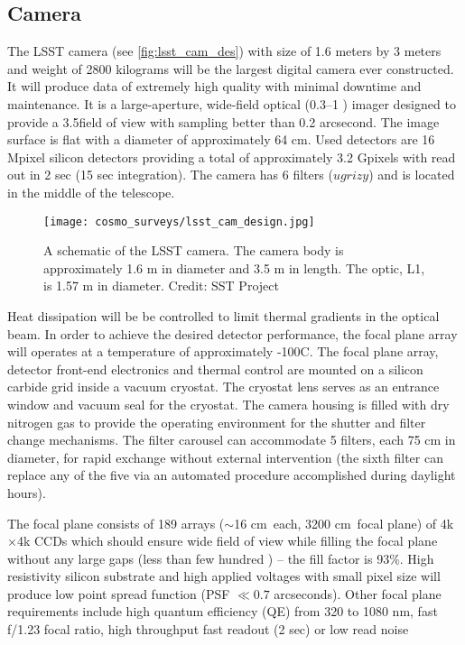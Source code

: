 \subsection{Camera}
The LSST camera (see \autoref{fig:lsst_cam_des}) with size of 1.6 meters by 3 meters and weight of 2800 kilograms will be the largest digital camera ever constructed. It will produce data of extremely high quality with minimal downtime and maintenance. It is a large-aperture, wide-field optical (0.3--1 \um) imager designed to provide a 3.5\textdegree field of view with sampling better than 0.2 arcsecond. The image surface is flat with a diameter of approximately 64 cm. Used detectors are 16 Mpixel silicon detectors providing a total of approximately 3.2 Gpixels with read out in 2 sec (15 sec integration). The camera has 6 filters ($ugrizy$) and is located in the middle of the telescope.
\begin{figure}[ht]
    \centering
    \texttt{[image: cosmo\_surveys/lsst\_cam\_design.jpg]}
    \caption{A schematic of the LSST camera. The camera body is approximately 1.6 m in diameter and 3.5 m in length. The optic, L1, is 1.57 m in diameter. Credit: SST Project}
    \label{fig:lsst_cam_des}
\end{figure}

Heat dissipation will be be controlled to limit thermal gradients in the optical beam. In order to achieve the desired detector performance, the focal plane array will operates at a temperature of approximately -100\textdegree C. The focal plane array, detector front-end electronics and thermal control are mounted on a silicon carbide grid inside a vacuum cryostat. The cryostat lens serves as an entrance window and vacuum seal for the cryostat. The camera housing is filled with dry nitrogen gas to provide the operating environment for the shutter and filter change mechanisms. The filter carousel can accommodate 5 filters, each 75 cm in diameter, for rapid exchange without external intervention (the sixth filter can replace any of the five via an automated procedure accomplished during daylight hours).

The focal plane consists of 189 arrays ($\sim$16 cm\sq\ each, 3200 cm\sq\ focal plane) of 4k$\times$4k CCDs which should ensure wide field of view while filling the focal plane without any large gaps (less than few hundred \um) -- the fill factor is 93\%. High resistivity silicon substrate and high applied voltages with small pixel size will produce low point spread function (PSF $\ll0.7$ arcseconds). Other focal plane requirements include high quantum efficiency (QE) from 320 to 1080 nm, fast f/1.23 focal ratio, high throughput fast readout (2 sec) or low read noise
